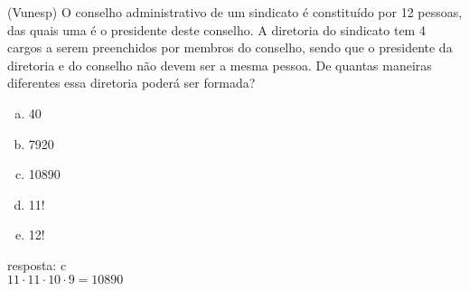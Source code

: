 \begin{ex}
(Vunesp) O conselho administrativo de um sindicato é constituído por 12 pessoas, das quais uma é o presidente deste conselho. A diretoria do sindicato tem 4 cargos a serem preenchidos por membros do conselho, sendo que o presidente da diretoria e do conselho não devem ser a mesma pessoa. De quantas maneiras diferentes essa diretoria poderá ser formada?
   \begin{enumerate}[(a)]
   \item 40
   \item 7920
   \item 10890
   \item 11!
   \item 12!
   \end{enumerate}
     \begin{sol}
       resposta: c \\
       $11\cdot11\cdot10\cdot9=10890$
     \end{sol}
\end{ex}